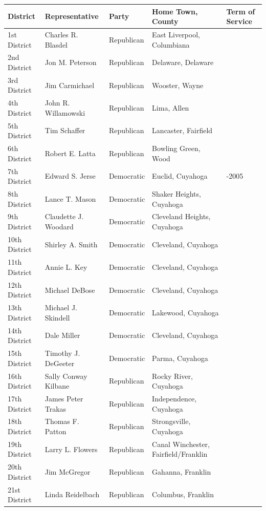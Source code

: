 \documentclass{article}
\begin{document}
\begin{tabular}{lllll}
\toprule
District & Representative & Party & Home Town, County & Term of Service \\
\midrule
1st District & Charles R. Blasdel & Republican & East Liverpool, Columbiana &  \\
2nd District & Jon M. Peterson & Republican & Delaware, Delaware &  \\
3rd District & Jim Carmichael & Republican & Wooster, Wayne &  \\
4th District & John R. Willamowski & Republican & Lima, Allen &  \\
5th District & Tim Schaffer & Republican & Lancaster, Fairfield &  \\
6th District & Robert E. Latta & Republican & Bowling Green, Wood &  \\
7th District & Edward S. Jerse & Democratic & Euclid, Cuyahoga & -2005 \\
8th District & Lance T. Mason & Democratic & Shaker Heights, Cuyahoga &  \\
9th District & Claudette J. Woodard & Democratic & Cleveland Heights, Cuyahoga &  \\
10th District & Shirley A. Smith & Democratic & Cleveland, Cuyahoga &  \\
11th District & Annie L. Key & Democratic & Cleveland, Cuyahoga &  \\
12th District & Michael DeBose & Democratic & Cleveland, Cuyahoga &  \\
13th District & Michael J. Skindell & Democratic & Lakewood, Cuyahoga &  \\
14th District & Dale Miller & Democratic & Cleveland, Cuyahoga &  \\
15th District & Timothy J. DeGeeter & Democratic & Parma, Cuyahoga &  \\
16th District & Sally Conway Kilbane & Republican & Rocky River, Cuyahoga &  \\
17th District & James Peter Trakas & Republican & Independence, Cuyahoga &  \\
18th District & Thomas F. Patton & Republican & Strongsville, Cuyahoga &  \\
19th District & Larry L. Flowers & Republican & Canal Winchester, Fairfield/Franklin &  \\
20th District & Jim McGregor & Republican & Gahanna, Franklin &  \\
21st District & Linda Reidelbach & Republican & Columbus, Franklin &  \\

\end{tabular}
\end{document}
